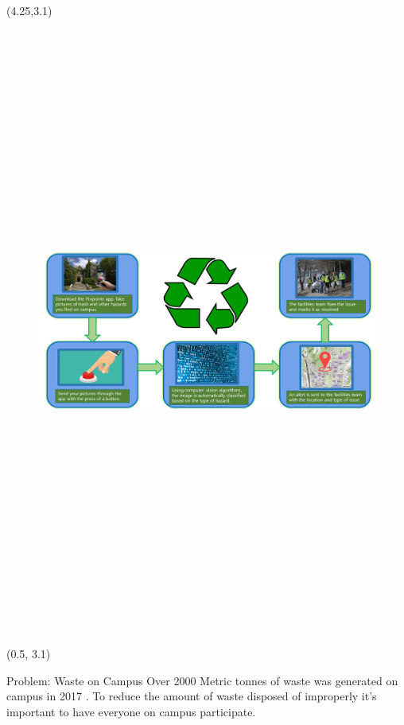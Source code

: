 \documentclass[22pt]{beamer}
\begin{document}
\begin{frame}[fragile]
\begin{textblock}{7}(4.25,3.1)
\begin{figure}[htbp] %
 \centering
\includegraphics[height=20cm]{flowchart.png}
\end{figure}
\end{textblock}

\begin{textblock}{3.5}(0.5, 3.1)
\begin{block}{Problem: Waste on Campus}
Over 2000 Metric tonnes of waste was generated on campus in 2017 \cite{mcmasterwaste}. To reduce the amount of waste disposed of improperly it’s important to have everyone on campus participate. \par


\end{block}
\end{textblock}
\end{frame}
\end{document}
